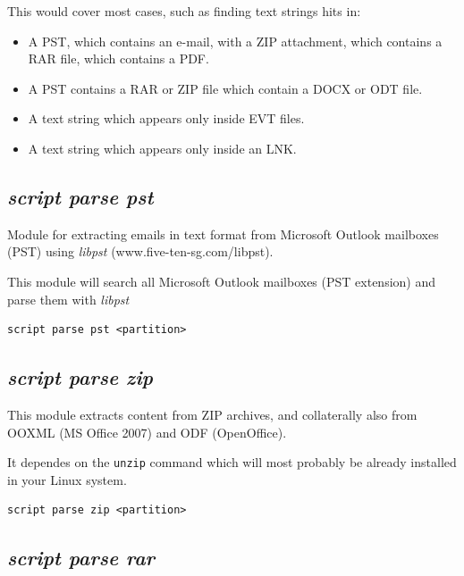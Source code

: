 \documentclass[a4paper,11pt,oneside]{report}
\begin{document}
This would cover most cases, such as finding text strings hits in:
\begin{itemize}
	\item A PST, which contains an e-mail, with a ZIP attachment, which contains a RAR file, which contains a PDF.
	\item A PST contains a RAR or ZIP file which contain a DOCX or ODT file.
	\item A text string which appears only inside EVT files.
	\item A text string which appears only inside an LNK. 
\end{itemize}



\subsection{\emph{script parse pst}}

Module for extracting emails in text format from Microsoft Outlook mailboxes (PST) using \emph{libpst} (www.five-ten-sg.com/libpst).

This module will search all Microsoft Outlook mailboxes (PST extension) and parse them with \emph{libpst}

\begin{verbatim}
script parse pst <partition>
\end{verbatim}




\subsection{\emph{script parse zip}}

This module extracts content from ZIP archives, and collaterally also from OOXML (MS Office 2007) and ODF (OpenOffice).

It dependes on the \texttt{unzip} command which will most probably be already installed in your Linux system.


\begin{verbatim}
script parse zip <partition>
\end{verbatim}




\subsection{\emph{script parse rar}}
\end{document}
